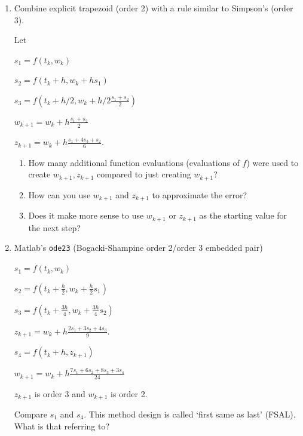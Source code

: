 \documentclass[12pt,letterpaper,noanswers]{exam}
\begin{document}


\begin{enumerate}[resume]
\item Combine explicit trapezoid (order 2) with a rule similar to Simpson's (order 3).

Let

$s_1 = f(t_k,w_k)$

$s_2 = f(t_k + h, w_k + hs_1)$

$s_3 = f\left(t_k+ h/2, w_k + h/2\frac{s_1+s_2}{2}\right)$

$w_{k+1} = w_k + h\frac{s_1+s_2}{2}$

$z_{k+1} = w_k + h\frac{s_1+4s_3+s_2}{6}$.

\begin{enumerate}
\item How many additional function evaluations (evaluations of $f$) were used to create $w_{k+1}, z_{k+1}$ compared to just creating $w_{k+1}$?
\vspace{1cm}

\item How can you use $w_{k+1}$ and $z_{k+1}$ to approximate the error?
\vspace{1cm}

\item Does it make more sense to use $w_{k+1}$ or $z_{k+1}$ as the starting value for the next step?
\vspace{1cm}
\end{enumerate}
\item Matlab's \texttt{ode23} (Bogacki-Shampine order 2/order 3 embedded pair)

$s_1 = f(t_k,w_k)$

$s_2 = f(t_k + \frac{h}{2}, w_k + \frac{h}{2}s_1)$

$s_3 = f(t_k + \frac{3h}{4}, w_k + \frac{3h}{4}s_2)$

$z_{k+1} = w_k + h\frac{2s_1+3s_2+4s_3}{9}$.

$s_4 = f(t_k+ h, z_{k+1})$

$w_{k+1} = w_k + h\frac{7s_1+6s_2+8s_3+3s_4}{24}$

$z_{k+1}$ is order 3 and $w_{k+1}$ is order 2.

Compare $s_1$ and $s_4$.  This method design is called `first same as last' (FSAL).  What is that referring to?

\end{enumerate}
\end{document}
